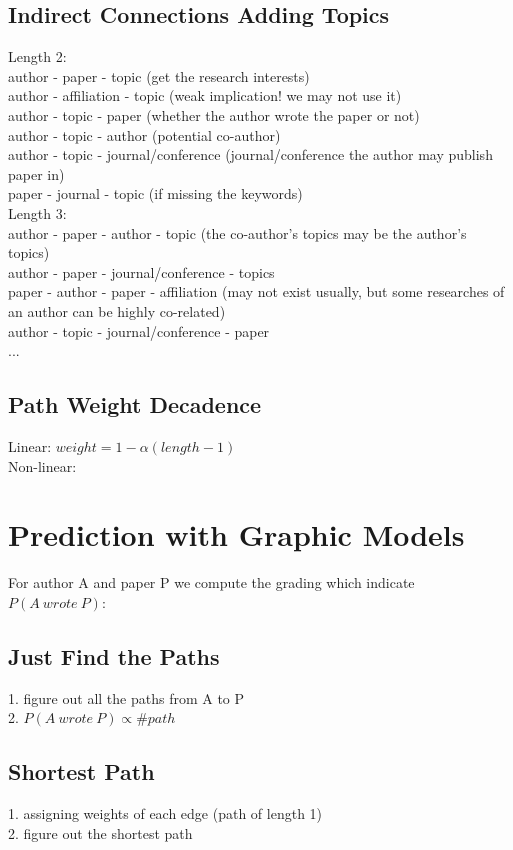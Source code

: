 \documentclass[12pt,a4paper]{article}
\begin{document}
\subsection{Indirect Connections Adding Topics}
Length 2:\\
author - paper - topic (get the research interests)\\
author - affiliation - topic (weak implication! we may not use it)\\
author - topic - paper (whether the author wrote the paper or not)\\
author - topic - author (potential co-author)\\
author - topic - journal/conference (journal/conference the author may publish paper in)\\
paper - journal - topic (if missing the keywords)\\
Length 3:\\
author - paper - author - topic (the co-author's topics may be the author's topics)\\
author - paper - journal/conference - topics\\
paper - author - paper - affiliation (may not exist usually, but some researches of an author can be highly co-related)\\
author - topic - journal/conference - paper\\
...

\subsection{Path Weight Decadence}
Linear: $weight = 1 - \alpha(length - 1)$\\
Non-linear: 

\section{Prediction with Graphic Models}
For author A and paper P we compute the grading which indicate $P(A\ wrote\ P)$:
\subsection{Just Find the Paths}
1. figure out all the paths from A to P\\
2. $P(A\ wrote\ P) \propto \#path$

\subsection{Shortest Path}
1. assigning weights of each edge (path of length 1)\\
2. figure out the shortest path
\end{document}

